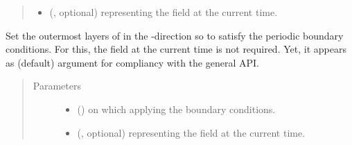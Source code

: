 \documentclass[letterpaper,10pt,english]{sphinxmanual}
\begin{document}
\begin{fulllineitems}
\begin{fulllineitems}
\begin{quote}
\begin{description}
\begin{itemize}
\item {} 
 (, optional) \textendash{}  representing the field at the current time.

\end{itemize}

\end{description}\end{quote}

\end{fulllineitems}


\begin{fulllineitems}
\label{\detokenize{api:dycore.horizontal_boundary.Periodic.set_outermost_layers_y}}
Set the outermost layers of  in the -direction so to satisfy the periodic
boundary conditions. For this, the field  at the current time is not required. Yet,
it appears as (default) argument for compliancy with the general API.
\begin{quote}\begin{description}
\item[{Parameters}] \leavevmode\begin{itemize}
\item {} 
 () \textendash{}  on which applying the boundary conditions.

\item {} 
 (, optional) \textendash{}  representing the field at the current time.

\end{itemize}

\end{description}\end{quote}

\end{fulllineitems}


\end{fulllineitems}
\end{document}
